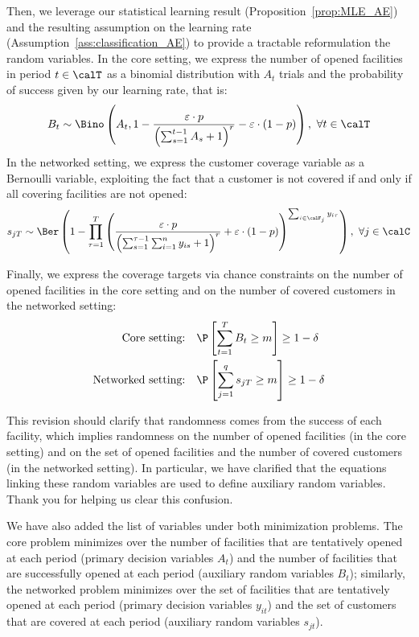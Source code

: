 \documentclass[11pt]{article}
\begin{document}
Then, we leverage our statistical learning result (Proposition~\ref{prop:MLE_AE}) and the resulting assumption on the learning rate (Assumption~\ref{ass:classification_AE}) to provide a tractable reformulation the random variables. In the core setting, we express the number of opened facilities in period $t\in\calT$ as a binomial distribution with $A_t$ trials and the probability of success given by our learning rate, that is:
$$B_t\sim \Bino\left(A_t, 1- \frac{\varepsilon\cdot p}{\left(\sum_{s=1}^{t-1} A_s +1\right)^r}-\varepsilon\cdot(1-p)\right),\ \forall t\in\calT$$
In the networked setting, we express the customer coverage variable as a Bernoulli variable, exploiting the fact that a customer is not covered if and only if all covering facilities are not opened:
$$s_{jT}\sim \Ber\left(1-\prod_{\tau=1}^T \left(\frac{\varepsilon\cdot p}{\left(\sum_{s=1}^{\tau-1} \sum_{i=1}^n y_{is} + 1\right)^r}+\varepsilon\cdot(1-p)\right)^{\sum_{i \in \calF_j} y_{i\tau}}\right),\ \forall j\in\calC$$

Finally, we express the coverage targets via chance constraints on the number of opened facilities in the core setting and on the number of covered customers in the networked setting:
\begin{align*}
    \text{Core setting:}\quad& \P\left[\sum_{t=1}^TB_t\geq m\right] \geq 1-\delta\\
    \text{Networked setting:}\quad& \P\left[\sum_{j=1}^q s_{jT} \geq m\right] \geq 1-\delta
\end{align*}

This revision should clarify that randomness comes from the success of each facility, which implies randomness on the number of opened facilities (in the core setting) and on the set of opened facilities and the number of covered customers (in the networked setting). In particular, we have clarified that the equations linking these random variables are used to define auxiliary random variables. Thank you for helping us clear this confusion.

We have also added the list of variables under both minimization problems. The core problem minimizes over the number of facilities that are tentatively opened at each period (primary decision variables $A_t$) and the number of facilities that are successfully opened at each period (auxiliary random variables $B_t$); similarly, the networked problem minimizes over the set of facilities that are tentatively opened at each period (primary decision variables $y_{it}$) and the set of customers that are covered at each period (auxiliary random variables $s_{jt}$).
\end{document}

